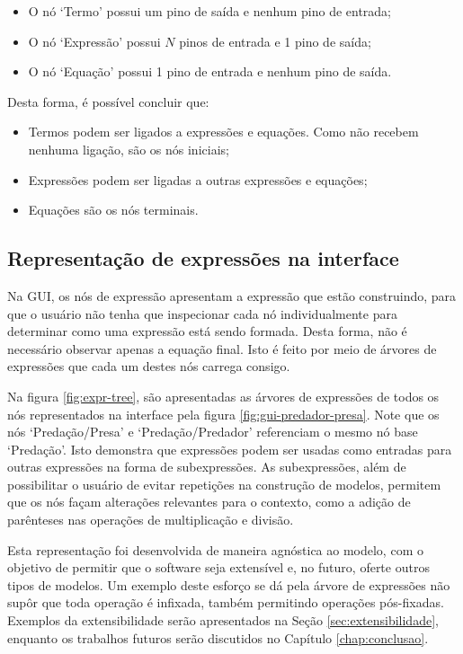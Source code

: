 \documentclass[
	12pt,				%
	openright,			%
	oneside,			%
	a4paper,			%
	main=brazil,
	english,			%
	]{ufsj-abntex2}
\begin{document}
\begin{itemize}
    \item O nó `Termo' possui um pino de saída e nenhum pino de entrada;
    \item O nó `Expressão' possui $N$ pinos de entrada e 1 pino de saída;
    \item O nó `Equação' possui 1 pino de entrada e nenhum pino de saída.
\end{itemize}

Desta forma, é possível concluir que:

\begin{itemize}
    \item Termos podem ser ligados a expressões e equações. Como não recebem nenhuma ligação, são os nós iniciais;
    \item Expressões podem ser ligadas a outras expressões e equações;
    \item Equações são os nós terminais.
\end{itemize}

\subsection{Representação de expressões na interface}
\label{subsec:exprtree}

Na GUI, os nós de expressão apresentam a expressão que estão construindo, para que o usuário não tenha que inspecionar cada nó individualmente para determinar como uma expressão está sendo formada. Desta forma, não é necessário observar apenas a equação final. Isto é feito por meio de árvores de expressões que cada um destes nós carrega consigo.

Na figura \ref{fig:expr-tree}, são apresentadas as árvores de expressões de todos os nós representados na interface pela figura \ref{fig:gui-predador-presa}. Note que os nós `Predação/Presa' e `Predação/Predador' referenciam o mesmo nó base `Predação'. Isto demonstra que expressões podem ser usadas como entradas para outras expressões na forma de subexpressões. As subexpressões, além de possibilitar o usuário de evitar repetições na construção de modelos, permitem que os nós façam alterações relevantes para o contexto, como a adição de parênteses nas operações de multiplicação e divisão.

Esta representação foi desenvolvida de maneira agnóstica ao modelo, com o objetivo de permitir que o software seja extensível e, no futuro, oferte outros tipos de modelos. Um exemplo deste esforço se dá pela árvore de expressões não supôr que toda operação é infixada, também permitindo operações pós-fixadas. Exemplos da extensibilidade serão apresentados na Seção \ref{sec:extensibilidade}, enquanto os trabalhos futuros serão discutidos no Capítulo \ref{chap:conclusao}.
\end{document}
